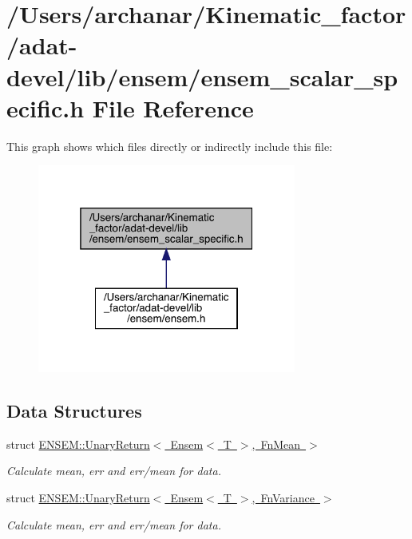 \hypertarget{adat-devel_2lib_2ensem_2ensem__scalar__specific_8h}{}\section{/\+Users/archanar/\+Kinematic\+\_\+factor/adat-\/devel/lib/ensem/ensem\+\_\+scalar\+\_\+specific.h File Reference}
\label{adat-devel_2lib_2ensem_2ensem__scalar__specific_8h}
This graph shows which files directly or indirectly include this file\+:
\nopagebreak
\begin{figure}[H]
\begin{center}
\leavevmode
\includegraphics[width=241pt]{dd/d72/adat-devel_2lib_2ensem_2ensem__scalar__specific_8h__dep__incl}
\end{center}
\end{figure}
\subsection*{Data Structures}
\begin{DoxyCompactItemize}
\item 
struct \mbox{\hyperlink{structENSEM_1_1UnaryReturn_3_01Ensem_3_01T_01_4_00_01FnMean_01_4}{E\+N\+S\+E\+M\+::\+Unary\+Return$<$ Ensem$<$ T $>$, Fn\+Mean $>$}}
\begin{DoxyCompactList}\small\item\em Calculate mean, err and err/mean for data. \end{DoxyCompactList}\item 
struct \mbox{\hyperlink{structENSEM_1_1UnaryReturn_3_01Ensem_3_01T_01_4_00_01FnVariance_01_4}{E\+N\+S\+E\+M\+::\+Unary\+Return$<$ Ensem$<$ T $>$, Fn\+Variance $>$}}
\begin{DoxyCompactList}\small\item\em Calculate mean, err and err/mean for data. \end{DoxyCompactList}\end{DoxyCompactItemize}
